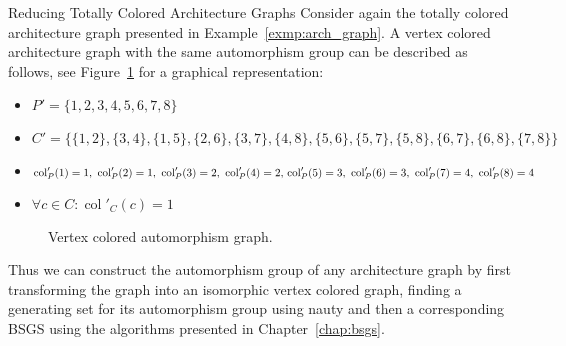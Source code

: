 \begin{exmp}{Reducing Totally Colored Architecture Graphs}
  Consider again the totally colored architecture graph presented in
  Example~\ref{exmp:arch_graph}. A vertex colored architecture graph with
  the same automorphism group can be described as follows, see
  Figure~\ref{fig:simple_arch_graph_vcol} for a graphical representation:
  \begin{itemize}
    \item $P' = \{1,2,3,4,5,6,7,8\}$
    \item $C' = \{\{1,2\},\{3,4\},\{1,5\},\{2,6\},\{3,7\},\{4,8\},\{5,6\},
                  \{5,7\},\{5,8\},\{6,7\},\{6,8\},\{7,8\}\}$
    \item $\operatorname{col}'_P(1) = 1,\ \operatorname{col}'_P(2) = 1,\ 
           \operatorname{col}'_P(3) = 2,\ \operatorname{col}'_P(4) = 2,\\
           \operatorname{col}'_P(5) = 3,\ \operatorname{col}'_P(6) = 3,\ 
           \operatorname{col}'_P(7) = 4,\ \operatorname{col}'_P(8) = 4$
    \item $\forall c \in C: \operatorname{col}'_C(c) = 1$
  \end{itemize}
  \begin{figure}[H]
    \centering
    \caption{Vertex colored automorphism graph.}
    \label{fig:simple_arch_graph_vcol}
  \end{figure}
\end{exmp}
%
Thus we can construct the automorphism group of any architecture graph by first
transforming the graph into an isomorphic vertex colored graph, finding a
generating set for its automorphism group using nauty and then a corresponding
BSGS using the algorithms presented in Chapter~\ref{chap:bsgs}.

